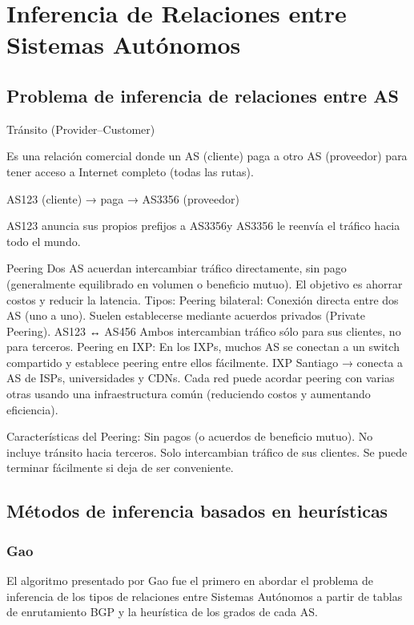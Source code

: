 ﻿\section{Inferencia de Relaciones entre Sistemas Autónomos} \label{sec:anexo_inferencia_relaciones_as}


\subsection{Problema de inferencia de relaciones entre AS} \label{sec:anexo_inferencia_relaciones_as_problema}



Tránsito (Provider–Customer)

Es una relación comercial donde un AS (cliente) paga a otro AS (proveedor) para tener acceso a Internet completo (todas las rutas).

AS123 (cliente) → paga → AS3356 (proveedor)

AS123 anuncia sus propios prefijos a AS3356y AS3356 le reenvía el tráfico hacia todo el mundo.

Peering
Dos AS acuerdan intercambiar tráfico directamente, sin pago (generalmente equilibrado en volumen o beneficio mutuo). El objetivo es ahorrar costos y reducir la latencia.
Tipos:
Peering bilateral: Conexión directa entre dos AS (uno a uno).
 Suelen establecerse mediante acuerdos privados (Private Peering).
AS123 ↔ AS456 	Ambos intercambian tráfico sólo para sus clientes, no para terceros.
Peering en IXP: En los IXPs, muchos AS se conectan a un switch compartido y establece peering entre ellos fácilmente. 
IXP Santiago → conecta a AS de ISPs, universidades y CDNs.
Cada red puede acordar peering con varias otras usando una infraestructura común (reduciendo costos y aumentando eficiencia).

Características del Peering:
Sin pagos (o acuerdos de beneficio mutuo).
No incluye tránsito hacia terceros.
Solo intercambian tráfico de sus clientes.
Se puede terminar fácilmente si deja de ser conveniente.





\subsection{Métodos de inferencia basados en heurísticas} \label{sec:anexo_inferencia_relaciones_as_heuristicas}

\subsubsection{Gao} \label{sec:anexo_gao}
El algoritmo presentado por Gao fue el primero en abordar el problema de inferencia de los tipos de relaciones entre Sistemas Autónomos a partir de tablas de enrutamiento BGP y la heurística de los grados de cada AS.


